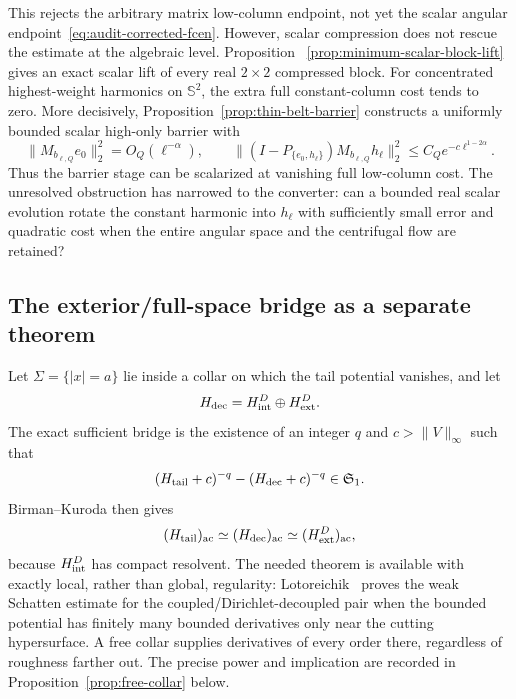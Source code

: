\documentclass[11pt]{article}
\newcommand{\TC}{\mathfrak S_1}
\newcommand{\ac}{\mathrm{ac}}
\theoremstyle{definition}
\theoremstyle{remark}
\begin{document}
This rejects the arbitrary matrix low-column endpoint, not yet the scalar
angular endpoint~\eqref{eq:audit-corrected-fcen}.  However, scalar compression
does not rescue the estimate at the algebraic level.  Proposition
~\ref{prop:minimum-scalar-block-lift} gives an exact scalar lift of every real
$2\times2$ compressed block.  For concentrated highest-weight harmonics on
$\mathbb S^2$, the extra full constant-column cost tends to zero.  More
decisively, Proposition~\ref{prop:thin-belt-barrier} constructs a uniformly
bounded scalar high-only barrier with
\begin{equation}
 \|M_{b_{\ell,Q}}e_0\|_2^2=O_Q(\ell^{-\alpha}),
 \qquad
 \|(I-P_{\{e_0,h_\ell\}})M_{b_{\ell,Q}}h_\ell\|_2^2
 \leq C_Qe^{-c\ell^{1-2\alpha}}.
 \label{eq:audit-scalar-belt-barrier}
\end{equation}
Thus the barrier stage can be scalarized at vanishing full low-column cost.
The unresolved obstruction has narrowed to the converter: can a bounded real
scalar evolution rotate the constant harmonic into $h_\ell$ with sufficiently
small error and quadratic cost when the entire angular space and the
centrifugal flow are retained?

\subsection{The exterior/full-space bridge as a separate theorem}

Let $\Sigma=\{|x|=a\}$ lie inside a collar on which the tail potential vanishes, and let
\begin{equation}
 H_{\rm dec}=H_{\rm int}^D\oplus H_{\rm ext}^D.
 \label{eq:audit-decoupled}
\end{equation}
The exact sufficient bridge is the existence of an integer $q$ and $c>\|V\|_\infty$ such that
\begin{equation}
 (H_{\rm tail}+c)^{-q}-(H_{\rm dec}+c)^{-q}\in\TC.
 \label{eq:audit-resolvent-power-bridge}
\end{equation}
Birman--Kuroda then gives
\begin{equation}
 (H_{\rm tail})_{\ac}\simeq(H_{\rm dec})_{\ac}
 \simeq(H_{\rm ext}^D)_{\ac},
 \label{eq:audit-ac-bridge}
\end{equation}
because $H_{\rm int}^D$ has compact resolvent.  The needed theorem is available with exactly local, rather than global, regularity: Lotoreichik~\cite[Theorem~4.17 and Corollary~4.19]{Lotoreichik2013} proves the weak Schatten estimate for the coupled/Dirichlet-decoupled pair when the bounded potential has finitely many bounded derivatives only near the cutting hypersurface.  A free collar supplies derivatives of every order there, regardless of roughness farther out.  The precise power and implication are recorded in Proposition~\ref{prop:free-collar} below.
\end{document}

